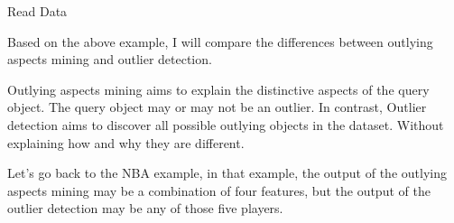 \documentclass[
 size=14pt,
 paper=smartboard,  %
 mode=present, 		%
 display=slides, 	%
 style=tuliplab,  	%
 pauseslide,
 fleqn,leqno]{powerdot}
\begin{document}
\begin{slide}[toc=,bm=]{Read Data}
\begin{center}

\end{center}

\bigskip


\begin{note}
Based on the above example,
I will compare the differences
between outlying aspects mining and outlier detection.

Outlying aspects mining aims to
explain the distinctive aspects of the query object.
The query object may or may not be an outlier.
In contrast,
Outlier detection aims to discover all possible
outlying objects in the dataset.
Without explaining how and why they are different.

Let's go back to the NBA example,
in that example,
the output of the outlying aspects mining may be
a combination of four features,
but the output of the outlier detection may be any of those five players.
\end{note}

\end{slide}
\end{document}
